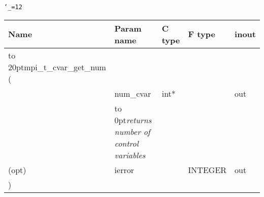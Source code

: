 \begingroup\tt\catcode`\_=12
\begin{tabular}{lllll}
\toprule
\textrm{Name}&\textrm{Param name}&\textrm{C type}&\textrm{F type}&\textrm{inout}\\
\midrule
\hbox to 20pt{mpi_t_cvar_get_num (\hss} \\
&num_cvar&int*&&out\\ [-3pt]
&\hbox to 0pt{\footnotesize\sl returns number of control variables\hss}\\
(opt)&ierror&&INTEGER&out\\
)\\
\bottomrule
\end{tabular}
\endgroup


